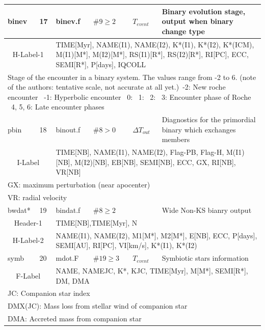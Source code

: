 \begin{longtable}{||p{0.42in}|p{0.25in}|p{0.6in}|p{0.6in}|p{0.4in}|p{2.3in}||}
   binev   & 17  & binev.f    & $\#9\geq2$   & $T_{event}$    & Binary evolution stage, output when binary change type \\\hline
\multicolumn{2}{|c|}{ H-Label-1 } & \multicolumn{4}{|p{4.4in}|}{ TIME[Myr], NAME(I1), NAME(I2), K*(I1), K*(I2), K*(ICM), M(I1)[M*], M(I2)[M*], RS(I1)[R*], RS(I2)[R*], RI[PC], ECC, SEMI[R*], P[days], IQCOLL } \\\hline
\multicolumn{6}{|p{5.4in}|}{Stage of the encounter in a binary system. The values range from -2 to 6. (note of the authors: tentative scale, not accurate at all yet.)\
-2: New roche encounter \
-1: Hyperbolic encounter \
0: \
1: \
2: \
3: Encounter phase of Roche \
4, 5, 6: Late encounter phases}\\\hline\hline

   pbin    & 18  & binout.f   & $\#8>0$    & $\Delta T_{out}$      & Diagnostics for the primordial binary which exchanges members \\\hline
\multicolumn{2}{|c|}{ I-Label } & \multicolumn{4}{|p{4.4in}|}{ TIME[NB], NAME(I1), NAME(I2), Flag-PB, Flag-H, M(I1)[NB], M(I2)[NB], EB[NB], SEMI[NB], ECC, GX, RI[NB], VR[NB] }\\\hline
\multicolumn{6}{|p{5.4in}|}{ GX: maximum perturbation (near apocenter)}\\\hline
\multicolumn{6}{|p{5.4in}|}{ VR: radial velocity }\\\hline\hline

   bwdat*  & 19  & bindat.f   & $\#8\geq2$   &             & Wide Non-KS bianry output    \\\hline
\multicolumn{2}{|c|}{ Header-1 } & \multicolumn{4}{|p{4.4in}|}{ TIME[NB],TIME[Myr], N }\\\hline
\multicolumn{2}{|c|}{ H-Label-2} & \multicolumn{4}{|p{4.4in}|}{ NAME(I1), NAME(I2), M1[M*], M2[M*], E[NB], ECC, P[days], SEMI[AU], RI[PC], VI[km/s], K*(I1), K*(I2) }\\\hline\hline

   symb   & 20  & mdot.F     & $\#19\geq3$  & $T_{event}$    & Symbiotic stars information  \\\hline
\multicolumn{2}{|c|}{ F-Label }  & \multicolumn{4}{|p{4.4in}|}{ NAME, NAMEJC, K*, KJC, TIME[Myr], M[M*], SEMI[R*], DM, DMA }\\\hline
\multicolumn{6}{|p{5.4in}|}{ JC: Companion star index}\\
\multicolumn{6}{|p{5.4in}|}{ 
DMX(JC): Mass loss from stellar wind of companion star }\\
\multicolumn{6}{|p{5.4in}|}{ DMA: Accreted mass from companion star }\\\hline\hline


\end{longtable}
